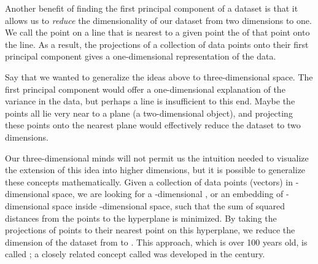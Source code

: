 %

Another benefit of finding the first principal component of a dataset is that it allows us to \textit{reduce} the dimensionality of our dataset from two dimensions to one. We call the point on a line that is nearest to a given point the  of that point onto the line. As a result, the projections of a collection of data points onto their first principal component gives a one-dimensional representation of the data.

Say that we wanted to generalize the ideas above to three-dimensional space. The first principal component would offer a one-dimensional explanation of the variance in the data, but perhaps a line is insufficient to this end. Maybe the points all lie very near to a plane (a two-dimensional object), and projecting these points onto the nearest plane would effectively reduce the dataset to two dimensions.

Our three-dimensional minds will not permit us the intuition needed to visualize the extension of this idea into higher dimensions, but it is possible to generalize these concepts mathematically. Given a collection of  data points (vectors) in -dimensional space, we are looking for a -dimensional , or an embedding of -dimensional space inside -dimensional space, such that the sum of squared distances from the points to the hyperplane is minimized. By taking the projections of points to their nearest point on this hyperplane, we reduce the dimension of the dataset from  to . This approach, which is over 100 years old, is called ; a closely related concept called  was developed in the  century.\\

